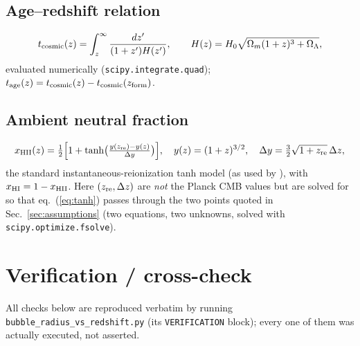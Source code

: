 \documentclass[11pt,a4paper]{article}
\begin{document}
\subsection{Age--redshift relation}
\begin{equation}
  t_{\rm cosmic}(z) = \int_z^\infty \frac{dz'}{(1+z')H(z')}, \qquad
  H(z) = H_0\sqrt{\Omega_m(1+z)^3+\Omega_\Lambda},
  \label{eq:age}
\end{equation}
evaluated numerically (\texttt{scipy.integrate.quad}); $t_{\rm age}(z)=t_{\rm cosmic}(z)-t_{\rm
cosmic}(z_{\rm form})$.

\subsection{Ambient neutral fraction}
\begin{equation}
  x_{\rm HII}(z) = \tfrac12\Bigl[1+\tanh\bigl(\tfrac{y(z_{\rm re})-y(z)}{\Delta y}\bigr)\Bigr], \quad
  y(z)=(1+z)^{3/2}, \quad \Delta y = \tfrac32\sqrt{1+z_{\rm re}}\,\Delta z,
  \label{eq:tanh}
\end{equation}
the standard instantaneous-reionization tanh model (as used by \citealt{Planck2018VI}), with
$x_{\rm HI}=1-x_{\rm HII}$. Here $(z_{\rm re},\Delta z)$ are \emph{not} the Planck CMB values but are solved
for so that eq.~(\ref{eq:tanh}) passes through the two \citet{Umeda2023} points quoted in
Sec.~\ref{sec:assumptions} (two equations, two unknowns, solved with \texttt{scipy.optimize.fsolve}).

\section{Verification / cross-check}
\label{sec:verification}

All checks below are reproduced verbatim by running \texttt{bubble\_radius\_vs\_redshift.py} (its
\texttt{VERIFICATION} block); every one of them was actually executed, not asserted.
\end{document}
